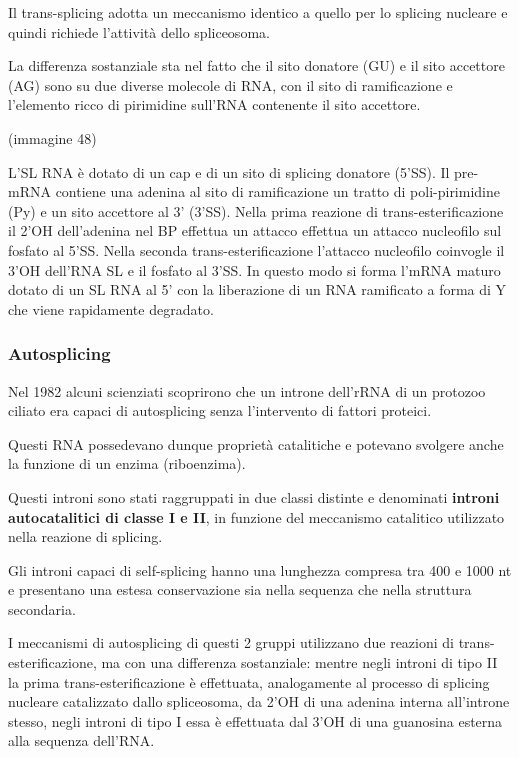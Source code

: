 \documentclass[]{article}
\begin{document}
Il trans-splicing adotta un meccanismo identico a quello per lo splicing
nucleare e quindi richiede l'attività dello spliceosoma.

La differenza sostanziale sta nel fatto che il sito donatore (GU) e il
sito accettore (AG) sono su due diverse molecole di RNA, con il sito di
ramificazione e l'elemento ricco di pirimidine sull'RNA contenente il
sito accettore.

(immagine 48)

L'SL RNA è dotato di un cap e di un sito di splicing donatore (5'SS). Il
pre-mRNA contiene una adenina al sito di ramificazione un tratto di
poli-pirimidine (Py) e un sito accettore al 3' (3'SS). Nella prima
reazione di trans-esterificazione il 2'OH dell'adenina nel BP effettua
un attacco effettua un attacco nucleofilo sul fosfato al 5'SS. Nella
seconda trans-esterificazione l'attacco nucleofilo coinvogle il 3'OH
dell'RNA SL e il fosfato al 3'SS. In questo modo si forma l'mRNA maturo
dotato di un SL RNA al 5' con la liberazione di un RNA ramificato a
forma di Y che viene rapidamente degradato.

\subsubsection{Autosplicing}\label{autosplicing}

Nel 1982 alcuni scienziati scoprirono che un introne dell'rRNA di un
protozoo ciliato era capaci di autosplicing senza l'intervento di
fattori proteici.

Questi RNA possedevano dunque proprietà catalitiche e potevano svolgere
anche la funzione di un enzima (riboenzima).

Questi introni sono stati raggruppati in due classi distinte e
denominati \textbf{introni autocatalitici di classe I e II}, in funzione
del meccanismo catalitico utilizzato nella reazione di splicing.

Gli introni capaci di self-splicing hanno una lunghezza compresa tra 400
e 1000 nt e presentano una estesa conservazione sia nella sequenza che
nella struttura secondaria.

I meccanismi di autosplicing di questi 2 gruppi utilizzano due reazioni
di trans-esterificazione, ma con una differenza sostanziale: mentre
negli introni di tipo II la prima trans-esterificazione è effettuata,
analogamente al processo di splicing nucleare catalizzato dallo
spliceosoma, da 2'OH di una adenina interna all'introne stesso, negli
introni di tipo I essa è effettuata dal 3'OH di una guanosina esterna
alla sequenza dell'RNA.
\end{document}
